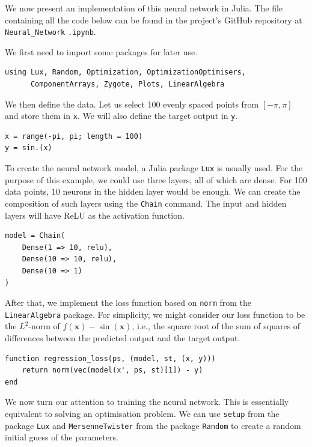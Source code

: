 \documentclass[a4paper,11pt,titlepage]{article}
\theoremstyle{definition}
\theoremstyle{plain}
\theoremstyle{remark}
\begin{document}
We now present an implementation of this neural network in Julia. The file containing all the code below can be found in the project's GitHub repository at \texttt{Neural\_Network}
\texttt{.ipynb}.

We first need to import some packages for later use.

\begin{verbatim}
using Lux, Random, Optimization, OptimizationOptimisers,
      ComponentArrays, Zygote, Plots, LinearAlgebra
\end{verbatim}

We then define the data. Let us select 100 evenly spaced points from $[-\pi, \pi]$ and store them in \verb|x|. We will also define the target output in \verb|y|.

\begin{verbatim}
x = range(-pi, pi; length = 100)
y = sin.(x)
\end{verbatim}

To create the neural network model, a Julia package \verb|Lux| is usually used. For the purpose of this example, we could use three layers, all of which are dense. For 100 data points, 10 neurons in the hidden layer would be enough. We can create the composition of such layers using the \verb|Chain| command. The input and hidden layers will have ReLU as the activation function.

\begin{verbatim}
model = Chain(
    Dense(1 => 10, relu),
    Dense(10 => 10, relu),
    Dense(10 => 1)
)
\end{verbatim}

After that, we implement the loss function based on \verb|norm| from the \verb|LinearAlgebra| package. For simplicity, we might consider our loss function to be the $L^2$-norm of $f(\mathbf{x}) - \sin (\mathbf{x})$, i.e., the square root of the sum of squares of differences between the predicted output and the target output.

\begin{verbatim}
function regression_loss(ps, (model, st, (x, y)))
    return norm(vec(model(x', ps, st)[1]) - y)
end
\end{verbatim}

We now turn our attention to training the neural network. This is essentially equivalent to solving an optimisation problem. We can use \verb|setup| from the package \verb|Lux| and \verb|MersenneTwister| from the package \verb|Random| to create a random initial guess of the parameters.
\end{document}
